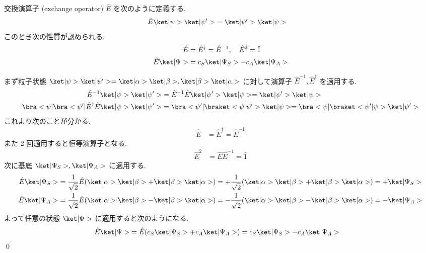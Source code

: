 \documentclass[uplatex,dvipdfmx,a4paper,11pt]{jlreq}
\makeatletter
\numberwithin{equation}{section}
\theoremstyle{definition}
\renewenvironment{proof}[1][\proofname]{\par
  \normalfont
  \topsep6\p@\@plus6\p@ \trivlist
  \item[\hskip\labelsep{\bfseries #1}\@addpunct{\bfseries}]\ignorespaces\quad\par
}{%
  \qed\endtrivlist\@endpefalse
}
\renewcommand\proofname{証明}
\makeatother
\begin{document}
\begin{proposition}[Q21-1(iii)(iv)(v)]
  交換演算子 (exchange operator) $\hat{E}$ を次のように定義する.
  \begin{align}
    \hat{E}\ket|\psi>\ket|\psi'> & = \ket|\psi'>\ket|\psi>
  \end{align}
  このとき次の性質が認められる.
  \begin{align}
    \hat{E}           & = \hat{E}^\dagger = \hat{E}^{-1}, \quad \hat{E}^2 = \hat{1} \\
    \hat{E}\ket|\Psi> & = c_S\ket|\Psi_S> - c_A\ket|\Psi_A>
  \end{align}
\end{proposition}
\begin{proof}
  まず粒子状態 $\ket|\psi>\ket|\psi'> = \ket|\alpha>\ket|\beta>, \ket|\beta>\ket|\alpha>$ に対して演算子 $\hat{E}^{-1}, \hat{E}^\dagger$ を適用する.
  \begin{align}
    \hat{E}^{-1}\ket|\psi>\ket|\psi'>                                & = \hat{E}^{-1}\hat{E}\ket|\psi'>\ket|\psi> = \ket|\psi'>\ket|\psi>                    \\
    \bra<\psi|\bra<\psi'|\hat{E}^\dagger\hat{E}\ket|\psi>\ket|\psi'> & = \bra<\psi'|\braket<\psi|\psi'>\ket|\psi> = \bra<\psi|\braket<\psi'|\psi>\ket|\psi'>
  \end{align}
  これより次のことが分かる.
  \begin{align}
    \hat{E} & = \hat{E}^\dagger = \hat{E}^{-1}
  \end{align}
  また 2 回適用すると恒等演算子となる.
  \begin{align}
    \hat{E}^2 & = \hat{E}\hat{E}^{-1} = \hat{1}
  \end{align}
  次に基底 $\ket|\Psi_S>, \ket|\Psi_A>$ に適用する.
  \begin{align}
    \hat{E}\ket|\Psi_S> & = \frac{1}{\sqrt{2}}\hat{E}(\ket|\alpha>\ket|\beta> + \ket|\beta>\ket|\alpha>) = +\frac{1}{\sqrt{2}}(\ket|\alpha>\ket|\beta> + \ket|\beta>\ket|\alpha>) = +\ket|\Psi_S> \\
    \hat{E}\ket|\Psi_A> & = \frac{1}{\sqrt{2}}\hat{E}(\ket|\alpha>\ket|\beta> - \ket|\beta>\ket|\alpha>) = -\frac{1}{\sqrt{2}}(\ket|\alpha>\ket|\beta> - \ket|\beta>\ket|\alpha>) = -\ket|\Psi_A>
  \end{align}
  よって任意の状態 $\ket|\Psi>$ に適用すると次のようになる.
  \begin{align}
    \hat{E}\ket|\Psi> & = \hat{E}(c_S\ket|\Psi_S> + c_A\ket|\Psi_A>) = c_S\ket|\Psi_S> - c_A\ket|\Psi_A>
  \end{align}
\end{proof}
\end{document}
